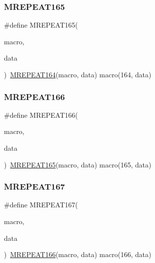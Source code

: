 \mbox{\label{group__group__sam0__utils__mrepeat_gaf19e2008c064792f7ae367fab6867c12}} 
\subsubsection{\texorpdfstring{MREPEAT165}{MREPEAT165}}
{\footnotesize\ttfamily \#define M\+R\+E\+P\+E\+A\+T165(\begin{DoxyParamCaption}\item[{}]{macro,  }\item[{}]{data }\end{DoxyParamCaption})~\mbox{\hyperlink{group__group__sam0__utils__mrepeat_ga5635a788c18814a98cca65d80c06dbfb}{M\+R\+E\+P\+E\+A\+T164}}(macro, data)   macro(164, data)}

\mbox{\label{group__group__sam0__utils__mrepeat_ga75661c9e3f382a6d40eb9da43d79f2d0}} 
\subsubsection{\texorpdfstring{MREPEAT166}{MREPEAT166}}
{\footnotesize\ttfamily \#define M\+R\+E\+P\+E\+A\+T166(\begin{DoxyParamCaption}\item[{}]{macro,  }\item[{}]{data }\end{DoxyParamCaption})~\mbox{\hyperlink{group__group__sam0__utils__mrepeat_gaf19e2008c064792f7ae367fab6867c12}{M\+R\+E\+P\+E\+A\+T165}}(macro, data)   macro(165, data)}

\mbox{\label{group__group__sam0__utils__mrepeat_ga252652614e5e3cb056e487b105bd598c}} 
\subsubsection{\texorpdfstring{MREPEAT167}{MREPEAT167}}
{\footnotesize\ttfamily \#define M\+R\+E\+P\+E\+A\+T167(\begin{DoxyParamCaption}\item[{}]{macro,  }\item[{}]{data }\end{DoxyParamCaption})~\mbox{\hyperlink{group__group__sam0__utils__mrepeat_ga75661c9e3f382a6d40eb9da43d79f2d0}{M\+R\+E\+P\+E\+A\+T166}}(macro, data)   macro(166, data)}

